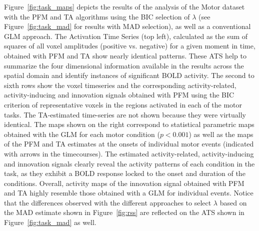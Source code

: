 Figure~\ref{fig:task_maps} depicts the results of the analysis of the Motor dataset with the PFM and TA algorithms using the BIC selection of $\lambda$ (see Figure~\ref{fig:task_mad} for results with MAD selection), as well as a conventional GLM approach. The Activation Time Series (top left), calculated as the sum of squares of all voxel amplitudes (positive vs. negative) for a given moment in time, obtained with PFM and TA show nearly identical patterns. These ATS help to summarize the four dimensional information available in the results across the spatial domain and identify instances of significant BOLD activity. The second to sixth rows show the voxel timeseries and the corresponding activity-related, activity-inducing and innovation signals obtained with PFM using the BIC criterion of representative voxels in the regions activated in each of the motor tasks. The TA-estimated time-series are not shown because they were virtually identical. The maps shown on the right correspond to statistical parametric maps obtained with the GLM for each motor condition ($p < 0.001$) as well as the maps of the PFM and TA estimates at the onsets of individual motor events (indicated with arrows in the timecourses). The estimated activity-related, activity-inducing and innovation signals clearly reveal the activity patterns of each condition in the task, as they exhibit a BOLD response locked to the onset and duration of the conditions. Overall, activity maps of the innovation signal obtained with PFM and TA highly resemble those obtained with a GLM for individual events. Notice that the differences observed with the different approaches to select $\lambda$ based on the MAD estimate shown in Figure~\ref{fig:rss} are reflected on the ATS shown in Figure~\ref{fig:task_mad} as well.

